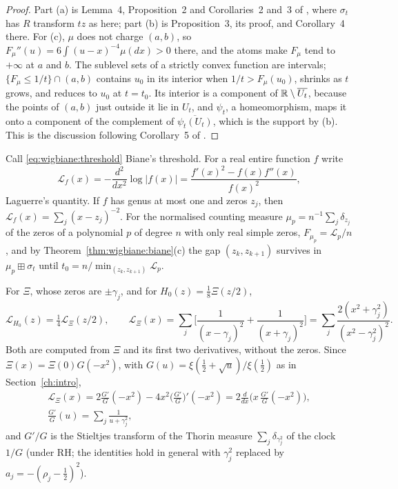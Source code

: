 \begin{proof}
Part (a) is Lemma~4, Proposition~2 and Corollaries~2 and~3 of \cite{Biane97}, where $\sigma_t$ has $R$ transform $tz$ as here; part (b) is Proposition~3, its proof, and Corollary~4 there. For (c), $\mu$ does not charge $(a,b)$, so $F_\mu''(u)=6\int(u-x)^{-4}\mu(dx)>0$ there, and the atoms make $F_\mu$ tend to $+\infty$ at $a$ and $b$. The sublevel sets of a strictly convex function are intervals; $\{F_\mu\le1/t\}\cap(a,b)$ contains $u_0$ in its interior when $1/t>F_\mu(u_0)$, shrinks as $t$ grows, and reduces to $u_0$ at $t=t_0$. Its interior is a component of $\mathbb{R}\setminus\overline{U_t}$, because the points of $(a,b)$ just outside it lie in $U_t$, and $\psi_t$, a homeomorphism, maps it onto a component of the complement of $\overline{\psi_t(U_t)}$, which is the support by (b). This is the discussion following Corollary~5 of \cite{Biane97}.
\end{proof}

Call \eqref{eq:wigbiane:threshold} Biane's threshold. For a real entire function $f$ write
\[
\mathcal L_f(x)=-\frac{d^2}{dx^2}\log|f(x)|=\frac{f'(x)^2-f(x)f''(x)}{f(x)^2},
\]
Laguerre's quantity. If $f$ has genus at most one and zeros $z_j$, then $\mathcal L_f(x)=\sum_j(x-z_j)^{-2}$. For the normalised counting measure $\mu_p=n^{-1}\sum_j\delta_{z_j}$ of the zeros of a polynomial $p$ of degree $n$ with only real simple zeros, $F_{\mu_p}=\mathcal L_p/n$, and by Theorem~\ref{thm:wigbiane:biane}(c) the gap $(z_k,z_{k+1})$ survives in $\mu_p\boxplus\sigma_t$ until $t_0=n/\min_{(z_k,z_{k+1})}\mathcal L_p$.

For $\Xi$, whose zeros are $\pm\gamma_j$, and for $H_0(z)=\frac18\Xi(z/2)$,
\[
\mathcal L_{H_0}(z)=\tfrac14\mathcal L_\Xi(z/2),\qquad\mathcal L_\Xi(x)=\sum_j\Big[\frac1{(x-\gamma_j)^2}+\frac1{(x+\gamma_j)^2}\Big]=\sum_j\frac{2(x^2+\gamma_j^2)}{(x^2-\gamma_j^2)^2}.
\]
Both are computed from $\Xi$ and its first two derivatives, without the zeros. Since $\Xi(x)=\Xi(0)G(-x^2)$, with $G(u)=\xi(\frac12+\sqrt u)/\xi(\frac12)$ as in Section~\ref{ch:intro},
\begin{gather*}
\mathcal L_\Xi(x)=2\frac{G'}G(-x^2)-4x^2\Big(\frac{G'}G\Big)'(-x^2)=2\frac{d}{dx}\Big(x\,\frac{G'}G(-x^2)\Big),\\
\frac{G'}G(u)=\sum_j\frac1{u+\gamma_j^2},
\end{gather*}
and $G'/G$ is the Stieltjes transform of the Thorin measure $\sum_j\delta_{\gamma_j^2}$ of the clock $1/G$ (under RH; the identities hold in general with $\gamma_j^2$ replaced by $a_j=-(\rho_j-\frac12)^2$).



